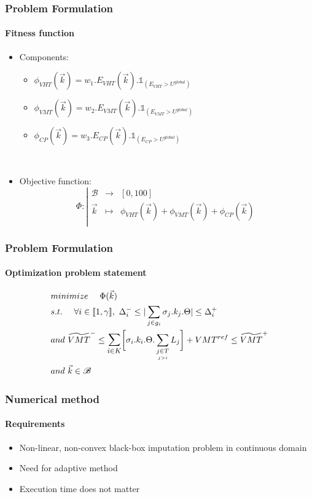 \documentclass[fleqn]{beamer}
\begin{document}
\begin{frame}
	\frametitle{Problem Formulation}
	\framesubtitle{Fitness function}
	\begin{itemize}
		\item Components: 
		\begin{itemize}
			\item $\phi_{VHT}(\vec{k})=w_{1}.E_{VHT}(\vec{k}).\mathds{1}_{(E_{VHT}>U^{global})}$\\
			\item $\phi_{VMT}(\vec{k})=w_{2}.E_{VMT}(\vec{k}).\mathds{1}_{(E_{VMT}>U^{global})}$\\
			\item $\phi_{CP}(\vec{k})=w_{3}.E_{CP}(\vec{k}).\mathds{1}_{(E_{CP}>U^{global})}$\\	
		\end{itemize}
		~\\
		\item Objective function: 
		\begin{equation*}
			\Phi:
			\left|
	  		\begin{array}{rcl}
		    	\mathscr{B} & \longrightarrow &[0,100] \\
		    	\vec{k} & \longmapsto &  \phi_{VHT}(\vec{k})+\phi_{VMT}(\vec{k})+\phi_{CP}(\vec{k}) \\
		  	\end{array}
			\right.
		\end{equation*}
	\end{itemize}			
\end{frame}


\begin{frame}
	\frametitle{Problem Formulation}
	\framesubtitle{Optimization problem statement}
	\begin{align*}
	&minimize\ \ \ \ \Phi(\vec{k}) \\
	&s.t.\ \ \ \ 	\forall i\in \llbracket 1,\gamma \rrbracket,\ \Delta_{i}^{-}\leq |\sum\limits_{j\in g_{i}}\sigma_{j}.k_{j}.\Theta| \leq \Delta_{i}^{+} \nonumber\\
	&and\ \widetilde{VMT}^{-}\leq\mathlarger{\sum\limits_{i\in K}}\biggl[\sigma_{i}.k_{i}.\Theta.	\sum\limits_{\underset{j>i}{j\in T}}L_{j}\biggr]+VMT^{ref}\leq \widetilde{VMT}^{+}\nonumber \\	
	&and\ \vec{k} \in \mathscr{B} \nonumber
	\end{align*}
\end{frame}


\begin{frame}
	\frametitle{Numerical method}
	\framesubtitle{Requirements}
	\begin{itemize}
		\item Non-linear, non-convex black-box imputation problem in continuous domain
		\item Need for adaptive method
		\item Execution time does not matter
	\end{itemize}
\end{frame}
\end{document}
